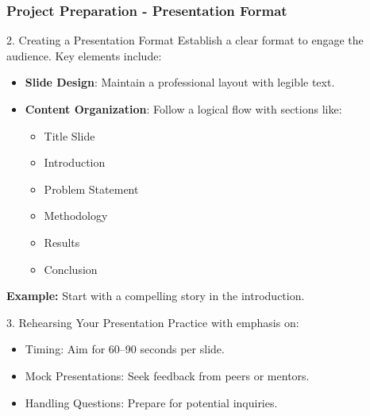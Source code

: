\documentclass{beamer}
\begin{document}
\begin{frame}[fragile]
    \frametitle{Project Preparation - Presentation Format}
    \begin{block}{2. Creating a Presentation Format}
        Establish a clear format to engage the audience. Key elements include:
        \begin{itemize}
            \item \textbf{Slide Design}: Maintain a professional layout with legible text.
            \item \textbf{Content Organization}: Follow a logical flow with sections like:
            \begin{itemize}
                \item Title Slide
                \item Introduction
                \item Problem Statement
                \item Methodology
                \item Results
                \item Conclusion
            \end{itemize}
        \end{itemize}
        \textbf{Example:} Start with a compelling story in the introduction.
    \end{block}

    \begin{block}{3. Rehearsing Your Presentation}
        Practice with emphasis on:
        \begin{itemize}
            \item Timing: Aim for 60–90 seconds per slide.
            \item Mock Presentations: Seek feedback from peers or mentors.
            \item Handling Questions: Prepare for potential inquiries.
        \end{itemize}
    \end{block}
\end{frame}
\end{document}
